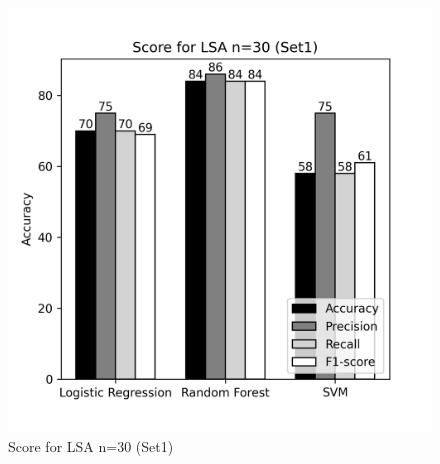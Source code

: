 \documentclass[12pt]{report}
\begin{document}
\begin{figure}[!htb]
\begin{minipage}{0.48\textwidth}
                  \includegraphics[scale=0.55]{plots/Score for LSA n=30 (Set1).png}
                  \caption{Score for LSA n=30 (Set1)}\label{Fig:typo2}
                \end{minipage}
             \end{figure}
\end{document}
